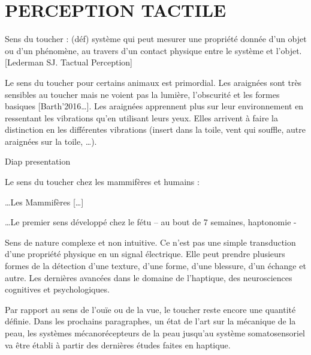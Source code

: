 \chapter{PERCEPTION TACTILE}
Sens du toucher : (déf) système qui peut mesurer une propriété donnée d’un objet ou d’un phénomène, au travers d’un contact physique entre le système et l’objet. [Lederman SJ. Tactual Perception]\par
Le sens du toucher pour certains animaux est primordial. Les araignées sont très sensibles au toucher mais ne voient pas la lumière, l’obscurité et les formes basiques [Barth’2016…]. Les araignées apprennent plus sur leur environnement en ressentant les vibrations qu’en utilisant leurs yeux. Elles arrivent à faire la distinction en les différentes vibrations (insert dans la toile, vent qui souffle, autre araignées sur la toile, …).\par
Diap presentation\par
Le sens du toucher chez les mammifères et humains :\par
…Les Mammifères […]\par
…Le premier sens développé chez le fétu – au bout de 7 semaines, haptonomie - \par
Sens de nature complexe et non intuitive. Ce n’est pas une simple transduction d’une propriété physique en un signal électrique. Elle peut prendre plusieurs formes de la détection d’une texture, d’une forme, d’une blessure, d’un échange et autre. Les dernières avancées dans le domaine de l’haptique, des neurosciences cognitives et psychologiques.\par
Par rapport au sens de l’ouïe ou de la vue, le toucher reste encore une quantité définie. Dans les prochains paragraphes, un état de l’art sur la mécanique de la peau, les systèmes mécanorécepteurs de la peau jusqu’au système somatosensoriel va être établi à partir des dernières études faites en haptique.\par

